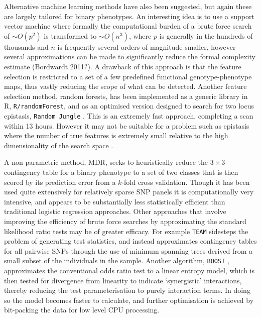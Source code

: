Alternative machine learning methods have also been suggested, but again these are largely tailored for binary phenotypes. An interesting idea is to use a support vector machine where formally the computational burden of a brute force search of $\sim O(p^2)$ is transformed to $\sim O(n^3)$, where $p$ is generally in the hundreds of thousands and $n$ is frequently several orders of magnitude smaller, however several approximations can be made to significantly reduce the formal complexity estimate (Bordwardt 2011?). A drawback of this approach is that the feature selection is restricted to a set of a few predefined functional genotype-phenotype maps, thus vastly reducing the scope of what can be detected. Another feature selection method, random forests, has been implemented as a generic library in R, {\tt R/randomForest}, and as an optimised version designed to search for two locus epistasis, {\tt Random Jungle} \citep{Schwarz2010}. This is an extremely fast approach, completing a scan within 13 hours. However it may not be suitable for a problem such as epistasis where the number of true features is extremely small relative to the high dimensionality of the search space \citep{Segal2004}. 

A non-parametric method, MDR, seeks to heuristically reduce the $3 \times 3$ contingency table for a binary phenotype to a set of two classes that is then scored by its prediction error from a $k$-fold cross validation. Though it has been used quite extensively for relatively sparse SNP panels it is computationally very intensive, and appears to be substantially less statistically efficient than traditional logistic regression approaches. Other approaches that involve improving the efficiency of brute force searches by approximating the standard likelihood ratio tests may be of greater efficacy. For example {\tt TEAM} \citep{Zhang2010} sidesteps the problem of generating test statistics, and instead approximates contingency tables for all pairwise SNPs through the use of minimum spanning trees derived from a small subset of the individuals in the sample. Another algorithm, {\tt BOOST} \citep{Wan2010}, approximates the conventional odds ratio test to a linear entropy model, which is then tested for divergence from linearity to indicate `synergistic' interactions, thereby reducing the test parameterisation to purely interaction terms. In doing so the model becomes faster to calculate, and further optimisation is achieved by bit-packing the data for low level CPU processing. 

